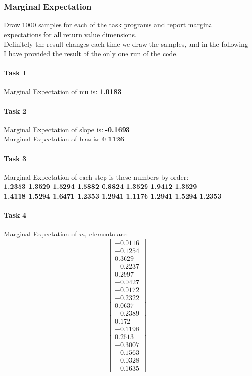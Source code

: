 \documentclass{article}
\def\blu#1{{\color{blu}#1}}
\begin{document}
\subsubsection{Marginal Expectation}
\blu{Draw 1000 samples for each of the task programs and report marginal expectations for all return value dimensions.}\\
Definitely  the result changes each time we draw the samples, and in the following I have provided the result of the only one run of the code.
\paragraph{Task 1}
Marginal Expectation of mu is: \textbf{1.0183}
\paragraph{Task 2}
Marginal Expectation of slope is: \textbf{-0.1693}\\
Marginal Expectation of bias is: \textbf{0.1126}
\paragraph{Task 3}
Marginal Expectation of each step is these numbers by order:\\ \textbf{1.2353
1.3529
1.5294
1.5882
0.8824
1.3529
1.9412
1.3529\\
1.4118
1.5294
1.6471
1.2353
1.2941
1.1176
1.2941
1.5294
1.2353}
\paragraph{Task 4}
Marginal Expectation of $w_1$ elements are:
\[
\begin{bmatrix}
-0.0116\\
-0.1254\\
0.3629\\
-0.2237\\
0.2997\\
-0.0427\\
-0.0172\\
-0.2322\\
0.0637\\
-0.2389\\
0.172\\
-0.1198\\
0.2513\\
-0.3007\\
-0.1563\\
-0.0328\\
-0.1635
\end{bmatrix}
\]
\end{document}
